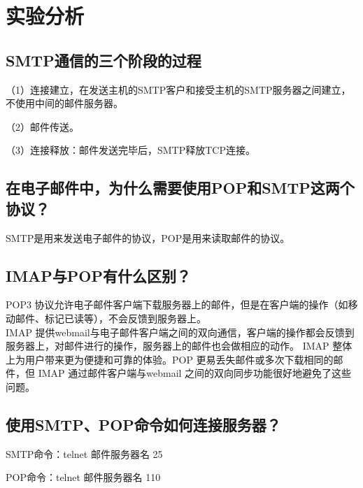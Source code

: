 \documentclass{article}
\begin{document}
\section{实验分析}
\subsection{SMTP通信的三个阶段的过程}
（1）连接建立，在发送主机的SMTP客户和接受主机的SMTP服务器之间建立，不使用中间的邮件服务器。

（2）邮件传送。

（3）连接释放：邮件发送完毕后，SMTP释放TCP连接。
\subsection{在电子邮件中，为什么需要使用POP和SMTP这两个协议？}
    SMTP是用来发送电子邮件的协议，POP是用来读取邮件的协议。
\subsection{IMAP与POP有什么区别？}
POP3 协议允许电子邮件客户端下载服务器上的邮件，但是在客户端的操作（如移动邮件、标记已读等），不会反馈到服务器上。\\

IMAP 提供webmail与电子邮件客户端之间的双向通信，客户端的操作都会反馈到服务器上，对邮件进行的操作，服务器上的邮件也会做相应的动作。
IMAP 整体上为用户带来更为便捷和可靠的体验。POP 更易丢失邮件或多次下载相同的邮件，但 IMAP 通过邮件客户端与webmail 之间的双向同步功能很好地避免了这些问题。
\subsection{使用SMTP、POP命令如何连接服务器？}
SMTP命令：telnet 邮件服务器名 25

POP命令：telnet  邮件服务器名  110
\end{document}
